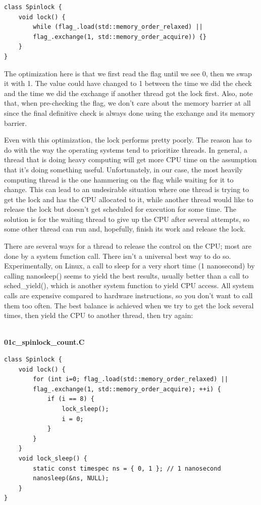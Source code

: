 \begin{lstlisting}[style=styleCXX]
class Spinlock {
	void lock() {
		while (flag_.load(std::memory_order_relaxed) ||
		flag_.exchange(1, std::memory_order_acquire)) {}
	}
}
\end{lstlisting}

The optimization here is that we first read the flag until we see 0, then we swap it with 1. The value could have changed to 1 between the time we did the check and the time we did the exchange if another thread got the lock first. Also, note that, when pre-checking the flag, we don't care about the memory barrier at all since the final definitive check is always done using the exchange and its memory barrier.

Even with this optimization, the lock performs pretty poorly. The reason has to do with the way the operating systems tend to prioritize threads. In general, a thread that is doing heavy computing will get more CPU time on the assumption that it's doing something useful. Unfortunately, in our case, the most heavily computing thread is the one hammering on the flag while waiting for it to change. This can lead to an undesirable situation where one thread is trying to get the lock and has the CPU allocated to it, while another thread would like to release the lock but doesn't get scheduled for execution for some time. The solution is for the waiting thread to give up the CPU after several attempts, so some other thread can run and, hopefully, finish its work and release the lock.

There are several ways for a thread to release the control on the CPU; most are done by a system function call. There isn't a universal best way to do so. Experimentally, on Linux, a call to sleep for a very short time (1 nanosecond) by calling nanosleep() seems to yield the best results, usually better than a call to sched\_yield(), which is another system function to yield CPU access. All system calls are expensive compared to hardware instructions, so you don't want to call them too often. The best balance is achieved when we try to get the lock several times, then yield the CPU to another thread, then try again:

\hspace*{\fill} \\ %
\noindent
\textbf{01c\_spinlock\_count.C}
\begin{lstlisting}[style=styleCXX]
class Spinlock {
	void lock() {
		for (int i=0; flag_.load(std::memory_order_relaxed) ||
		flag_.exchange(1, std::memory_order_acquire); ++i) {
			if (i == 8) {
				lock_sleep();
				i = 0;
			}
		}
	}
	void lock_sleep() {
		static const timespec ns = { 0, 1 }; // 1 nanosecond
		nanosleep(&ns, NULL);
	}
}
\end{lstlisting}

